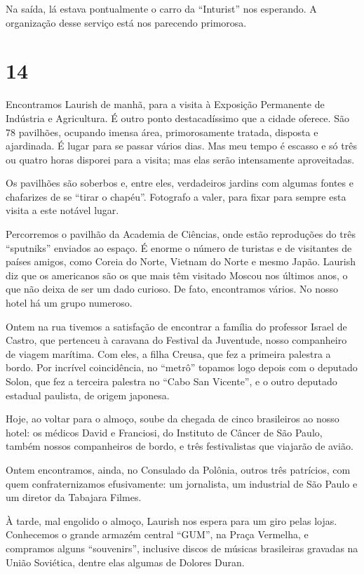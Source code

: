 Na saída, lá estava pontualmente o carro da ``Inturist'' nos esperando. A organização desse serviço está nos parecendo primorosa.

\section*{14 \adfflatleafright {}}
Encontramos Laurish de manhã, para a visita à Exposição Permanente de Indústria e Agricultura. É outro ponto destacadíssimo que a cidade oferece. São 78 pavilhões, ocupando imensa área, primorosamente tratada, disposta e ajardinada. É lugar para se passar vários dias. Mas meu tempo é escasso e só três ou quatro horas disporei para a visita; mas elas serão intensamente aproveitadas.

Os pavilhões são soberbos e, entre eles, verdadeiros jardins com algumas fontes e chafarizes de se ``tirar o chapéu''. Fotografo a valer, para fixar para sempre esta visita a este notável lugar.

Percorremos o pavilhão da Academia de Ciências, onde estão reproduções do três ``sputniks'' enviados ao espaço. É enorme o número de turistas e de visitantes de países amigos, como Coreia do Norte, Vietnam do Norte e mesmo Japão. Laurish diz que os americanos são os que mais têm visitado Moscou nos últimos anos, o que não deixa de ser um dado curioso. De fato, encontramos vários. No nosso hotel há um grupo numeroso.

Ontem na rua tivemos a satisfação de encontrar a família do professor Israel de Castro, que pertenceu à caravana do Festival da Juventude, nosso companheiro de viagem marítima. Com eles, a filha Creusa, que fez a primeira palestra a bordo. Por incrível coincidência, no ``metrô'' topamos logo depois com o deputado Solon, que fez a terceira palestra no ``Cabo San Vicente'', e o outro deputado estadual paulista, de origem japonesa.

Hoje, ao voltar para o almoço, soube da chegada de cinco brasileiros ao nosso hotel: os médicos David e Franciosi, do Instituto de Câncer de São Paulo, também nossos companheiros de bordo, e três festivalistas que viajarão de avião.

Ontem encontramos, ainda, no Consulado da Polônia, outros três patrícios, com quem confraternizamos efusivamente: um jornalista, um industrial de São Paulo e um diretor da Tabajara Filmes.

À tarde, mal engolido o almoço, Laurish nos espera para um giro pelas lojas. Conhecemos o grande armazém central ``GUM'', na Praça Vermelha, e compramos alguns ``souvenirs'', inclusive discos de músicas brasileiras gravadas na União Soviética, dentre elas algumas de Dolores Duran.

